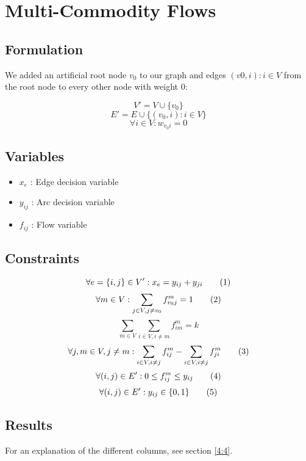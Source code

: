 \section{Multi-Commodity Flows}

\subsection{Formulation}

We added an artificial root node $v_0$ to our graph and edges $(v0,i) : i \in V$  from the root node to every other node with weight $0$:

\[V' = V \cup \{v_0\}\]
\[E' = E \cup \{(v_0,i) : i \in V\}\]
\[\forall i \in V : w_{v_0i} = 0 \]

\subsection{Variables}

\begin{itemize}
	\item $x_{e}$ : Edge decision variable
	\item $y_{ij}$ : Arc decision variable
	\item $f_{ij}$ : Flow variable
\end{itemize}

\subsection{Constraints}

\[ \forall e = \{i,j\} \in V' : x_e = y_{ij} + y_{ji} \addtag \]
\[ \forall m \in V : \sum_{j \in V,j \neq v_0}f^m_{v_0j} = 1 \addtag \]
\[ \sum_{m \in V}\sum_{i \in V,i \neq m}f^m_{im} = k\]
\[ \forall j,m \in V, j \neq m : \sum_{i \in V, i \neq j}f^m_{ij} - \sum_{i \in V, i \neq j}f^m_{ji} \addtag \]
\[ \forall (i,j) \in E' : 0 \leq f^m_{ij} \leq y_{ij} \addtag \]
\[ \forall (i,j) \in E' : y_{ij} \in \{0,1\} \addtag \]

\vspace{2.5cm}

\subsection{Results}

For an explanation of the different columns, see section \ref{4:4}.

\vspace{0.5cm}


